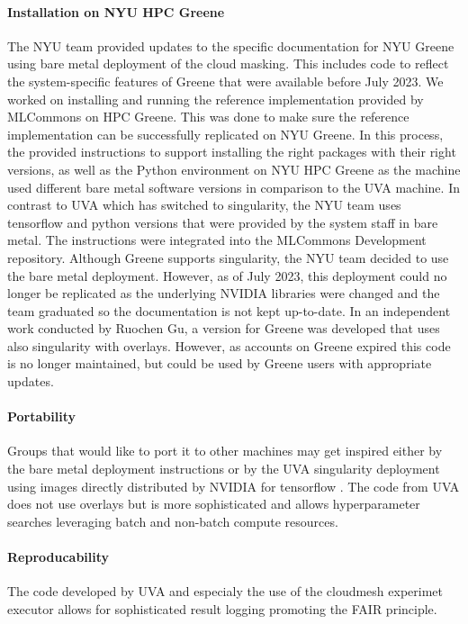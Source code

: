 \documentclass[sigplan,screen]{acmart}
\begin{document}
\paragraph{Installation on NYU HPC Greene} The NYU team provided updates to the specific documentation for NYU Greene using bare metal deployment of the cloud masking. This includes code to reflect the system-specific features of Greene that were available before July 2023. We worked on installing and running the reference implementation provided by MLCommons on HPC Greene. This was done to make sure the reference implementation can be successfully replicated on NYU Greene. In this process, the provided instructions to support installing the right packages with their right versions, as well as the Python environment on NYU HPC Greene as the machine used different bare metal software versions in comparison to the UVA machine.  In contrast to UVA which has switched to singularity, the NYU team uses tensorflow and python versions that were provided by the system staff in bare metal. The instructions were integrated into the MLCommons Development repository. Although Greene supports singularity, the NYU team decided to use the bare metal deployment. However, as of July 2023, this deployment could no longer be replicated as the underlying NVIDIA libraries were changed and the team graduated so the documentation is not kept up-to-date. 
In an independent work conducted by Ruochen Gu, a version for Greene was developed that uses also singularity with overlays. However, as accounts on Greene expired this code is no longer maintained, but could be used by Greene users with appropriate updates.

\paragraph{Portability} Groups that would like to port it to other machines may get inspired either by the bare metal deployment instructions or by the UVA singularity deployment using images directly distributed by NVIDIA for tensorflow \cite{las-2023-escience-cloudmask}. The code from UVA does not use overlays but is more sophisticated and allows hyperparameter searches leveraging batch and non-batch compute resources.

\paragraph{Reproducability} The code developed by UVA and especialy the use of the cloudmesh experimet executor \cite{github-cloudmesh-ee,las-2023-escience-cloudmask} allows for sophisticated result logging promoting the FAIR principle.
\end{document}
